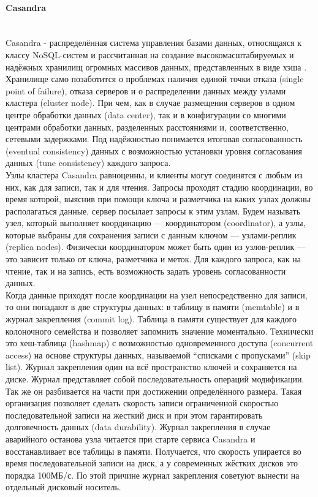 \paragraph{Casandra} ~\\
Casandra - распределённая система управления базами данных, относящаяся к классу NoSQL-систем и рассчитанная на создание высокомасштабируемых и надёжных хранилищ огромных массивов данных, представленных в виде хэша \autocite{casandra}. \\
Хранилище само позаботится о проблемах наличия единой точки отказа (single point of failure), отказа серверов и о распределении данных между узлами кластера (cluster node). При чем, как в случае размещения серверов в одном центре обработки данных (data center), так и в конфигурации со многими центрами обработки данных, разделенных расстояниями и, соответственно, сетевыми задержками. Под надёжностью понимается итоговая согласованность (eventual consistency) данных с возможностью установки уровня согласования данных (tune consistency) каждого запроса. \\
Узлы кластера Casandra равноценны, и клиенты могут соединятся с любым из них, как для записи, так и для чтения. Запросы проходят стадию координации, во время которой, выяснив при помощи ключа и разметчика на каких узлах должны располагаться данные, сервер посылает запросы к этим узлам. Будем называть узел, который выполняет координацию — координатором (coordinator), а узлы, которые выбраны для сохранения записи с данным ключом — узлами-реплик (replica nodes). Физически координатором может быть один из узлов-реплик — это зависит только от ключа, разметчика и меток.
Для каждого запроса, как на чтение, так и на запись, есть возможность задать уровень согласованности данных. \\
Когда данные приходят после координации на узел непосредственно для записи, то они попадают в две структуры данных: в таблицу в памяти (memtable) и в журнал закрепления (commit log). Таблица в памяти существует для каждого колоночного семейства и позволяет запомнить значение моментально. Технически это хеш-таблица (hashmap) с возможностью одновременного доступа (concurrent access) на основе структуры данных, называемой “списками с пропусками” (skip list). Журнал закрепления один на всё пространство ключей и сохраняется на диске. Журнал представляет собой последовательность операций модификации. Так же он разбивается на части при достижении определённого размера.
Такая организация позволяет сделать скорость записи ограниченной скоростью последовательной записи на жесткий диск и при этом гарантировать долговечность данных (data durability). Журнал закрепления в случае аварийного останова узла читается при старте сервиса Casandra и восстанавливает все таблицы в памяти. Получается, что скорость упирается во время последовательной записи на диск, а у современных жёстких дисков это порядка 100МБ/с. По этой причине журнал закрепления советуют вынести на отдельный дисковый носитель.

